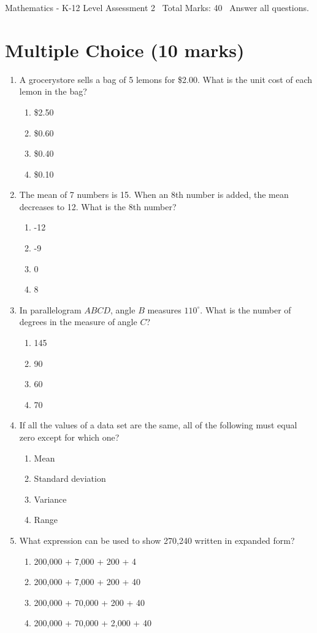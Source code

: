 \documentclass[12pt]{article}
\begin{document}
\begin{center}
Mathematics - K-12 Level Assessment 2 \
Total Marks: 40 \
Answer all questions.
\end{center}

\section*{Multiple Choice (10 marks)}
\begin{enumerate}[label=\arabic*.]
\item A grocerystore sells a bag of 5 lemons for \$2.00. What is the unit cost of each lemon in
the bag?
\begin{enumerate}[label=(\alph*)]
    \item \$2.50
    \item \$0.60
    \item \$0.40
    \item \$0.10
\end{enumerate}
\item The mean of 7 numbers is 15. When an 8th number is added, the mean decreases to 12. What
is the 8th number?
\begin{enumerate}[label=(\alph*)]
    \item -12
    \item -9
    \item 0
    \item 8
\end{enumerate}
\item In parallelogram $ABCD$, angle $B$ measures $110^\circ$. What is the number of degrees in
the measure of angle $C$?
\begin{enumerate}[label=(\alph*)]
    \item 145
    \item 90
    \item 60
    \item 70
\end{enumerate}
\item If all the values of a data set are the same, all of the following must equal zero except
for which one?
\begin{enumerate}[label=(\alph*)]
    \item Mean
    \item Standard deviation
    \item Variance
    \item Range
\end{enumerate}
\item What expression can be used to show 270,240 written in expanded form?
\begin{enumerate}[label=(\alph*)]
    \item 200,000 + 7,000 + 200 + 4
    \item 200,000 + 7,000 + 200 + 40
    \item 200,000 + 70,000 + 200 + 40
    \item 200,000 + 70,000 + 2,000 + 40
\end{enumerate}
\end{enumerate}
\end{document}
